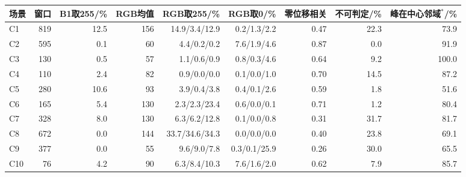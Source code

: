 \begin{tabular}{@{}lrrrrrrrr@{}}
\toprule
场景 & 窗口 & B1取255/\% & RGB均值 & RGB取255/\% & RGB取0/\% & 零位移相关 & 不可判定/\% & 峰在中心邻域$^{*}$/\%\\
\midrule
C1 & 819 & 12.5 & 156 & 14.9/3.4/12.9 & 0.2/1.3/2.2 & 0.47 & 22.3 & 73.9 \\
C2 & 595 & 0.1 & 60 & 4.4/0.2/0.2 & 7.6/1.9/4.6 & 0.87 & 0.0 & 91.9 \\
C3 & 130 & 0.5 & 57 & 1.1/0.6/0.9 & 0.8/0.3/4.6 & 0.64 & 9.2 & 100.0 \\
C4 & 110 & 2.4 & 82 & 0.9/0.0/0.0 & 0.1/0.0/1.0 & 0.70 & 14.5 & 87.2 \\
C5 & 280 & 10.6 & 93 & 3.9/0.4/3.8 & 0.4/0.1/2.6 & 0.59 & 1.8 & 51.6 \\
C6 & 165 & 5.4 & 130 & 2.3/2.3/23.4 & 0.6/0.0/0.1 & 0.71 & 1.2 & 80.4 \\
C7 & 328 & 8.0 & 130 & 6.3/6.2/12.8 & 0.1/0.0/0.8 & 0.31 & 31.7 & 81.7 \\
C8 & 672 & 0.0 & 144 & 33.7/34.6/34.3 & 0.0/0.0/0.0 & 0.40 & 23.8 & 69.1 \\
C9 & 377 & 0.0 & 55 & 9.6/9.0/7.8 & 0.3/0.1/25.9 & 0.26 & 30.0 & 65.5 \\
C10 & 76 & 4.2 & 90 & 6.3/8.4/10.3 & 7.6/1.6/2.0 & 0.62 & 7.9 & 85.7 \\
\bottomrule
\end{tabular}
